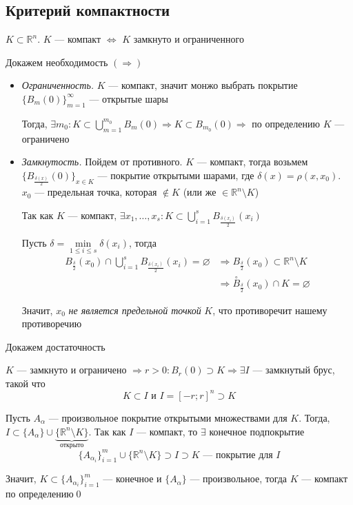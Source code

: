 \documentclass[a4paper, 10pt]{article}
\begin{document}
\subsection{Критерий компактности}
\theorem $K\subset \mathbb{R}^n$. $K$ — компакт $\Longleftrightarrow$ $K$ замкнуто и ограниченного

\proof Докажем необходимость $(\Longrightarrow)$
\begin{itemize}
    \item \textit{Ограниченность.} $K$ — компакт, значит монжо выбрать покрытие $\{B_{m}(0)\}_{m=1}^{\infty}$ — открытые шары
    
    Тогда, $\exists m_0:K\subset \displaystyle\bigcup_{m=1}^{m_0} B_m(0)\Longrightarrow K\subset B_{m_0}(0)\Longrightarrow$ по определению $K$ — ограничено

    \item \textit{Замкнутость.} Пойдем от противного. $K$ — компакт, тогда возьмем $\{B_{\frac{\delta(x)}{2}}(0)\}_{x\in K}$ — покрытие открытыми шарами, где $\delta(x)=\rho(x,x_0)$. $x_0$ — предельная точка, которая $\notin K$ (или же $\in \mathbb{R}^n\setminus K$)
    
    Так как $K$ — компакт, $\exists x_1,\ldots, x_s:K\subset\displaystyle\bigcup_{i=1}^{s} B_{\frac{\delta(x_i)}{2}}(x_i)$

    Пусть $\delta=\min\limits_{1\leqslant i\leqslant s}{\delta(x_i)}$, тогда
    \begin{equation*}
        \begin{aligned}
            B_{\frac{\delta}{2}}(x_0)\cap\bigcup_{i=1}^{s}B_{\frac{\delta(x_i)}{2}}(x_i)=\varnothing&\Longrightarrow B_{\frac{\delta}{2}}(x_0)\subset\mathbb{R}^n\setminus K\\
            &\Longrightarrow\stackrel{\circ}{B}_{\frac{\delta}{2}}(x_0)\cap K=\varnothing
        \end{aligned}
    \end{equation*}

    Значит, $x_0$ \textit{не является предельной точкой} $K$, что противоречит нашему противоречию
\end{itemize}

\proof Докажем достаточность

$K$ — замкнуто и ограничено $\Longrightarrow r>0:B_r(0)\supset K\Longrightarrow\exists I$ — замкнутый брус, такой что 
$$K\subset I\text{ и }I=[-r;r]^n\supset K$$

Пусть $A_{\alpha}$ — произвольное покрытие открытыми множествами для $K$. Тогда, $I\subset \{A_{\alpha}\}\cup\underbrace{\{\mathbb{R}^n\setminus K\}}_{\text{открыто}}$. Так как $I$ — компакт, то $\exists $ конечное подпокрытие 
$$\{A_{\alpha_i}\}_{i=1}^m\cup\{\mathbb{R}^n\setminus K\}\supset I\supset K\text{ — покрытие для $I$}$$

Значит, $K\subset\{A_{\alpha_i}\}_{i=1}^{m}$ — конечное и $\{A_{\alpha}\}$ — произвольное, тогда $K$ — компакт по определению\qed
\end{document}

